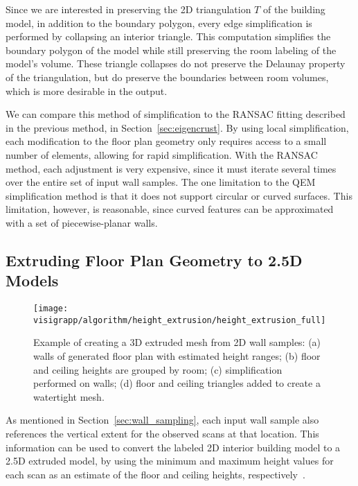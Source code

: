 \documentclass[12pt,onecolumn,oneside]{book}
\begin{document}
Since we are interested in preserving the 2D triangulation $T$ of the building model, in addition to the boundary polygon, every edge simplification is performed by collapsing an interior triangle.  This computation simplifies the boundary polygon of the model while still preserving the room labeling of the model's volume.  These triangle collapses do not preserve the Delaunay property of the triangulation, but do preserve the boundaries between room volumes, which is more desirable in the output.

We can compare this method of simplification to the RANSAC fitting described in the previous method, in Section~\ref{sec:eigencrust}.  By using local simplification, each modification to the floor plan geometry only requires access to a small number of elements, allowing for rapid simplification.  With the RANSAC method, each adjustment is very expensive, since it must iterate several times over the entire set of input wall samples.  The one limitation to the QEM simplification method is that it does not support circular or curved surfaces.  This limitation, however, is reasonable, since curved features can be approximated with a set of piecewise-planar walls.

\subsection{Extruding Floor Plan Geometry to 2.5D Models}
\label{ssec:fp_extrusion}

\begin{figure}
  \centering
  \texttt{[image: visigrapp/algorithm/height\_extrusion/height\_extrusion\_full]}
  \caption[Example of creating a 3D extruded mesh from 2D wall samples.]{Example of creating a 3D extruded mesh from 2D wall samples:  (a) walls of generated floor plan with estimated height ranges; (b) floor and ceiling heights are grouped by room; (c) simplification performed on walls; (d) floor and ceiling triangles added to create a watertight mesh.}
  \label{fig:heightextrusion}
\end{figure}

As mentioned in Section~\ref{sec:wall_sampling}, each input wall sample also references the vertical extent for the observed scans at that location.  This information can be used to convert the labeled 2D interior building model to a 2.5D extruded model, by using the minimum and maximum height values for each scan as an estimate of the floor and ceiling heights, respectively~\cite{Turner14}.
\end{document}
